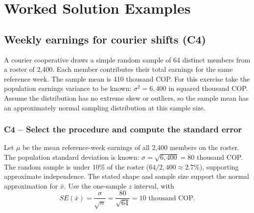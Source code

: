 	\section{Worked Solution Examples}
	\label{sec:worked-solution-examples}


	\subsection{Weekly earnings for courier shifts (C4)}
	\label{prob:c4-1}

	A courier cooperative draws a simple random sample of 64 distinct members from a roster of 2,400. Each member contributes their total earnings for the same reference week. The sample mean is 410 thousand COP. For this exercise take the population earnings variance to be known: $\sigma^2=6{,}400$ in squared thousand COP. Assume the distribution has no extreme skew or outliers, so the sample mean has an approximately normal sampling distribution at this sample size.


	\clearpage

	\label{sol:c4-1-a}
	\subsubsection*{C4 -- Select the procedure and compute the standard error}

	Let $\mu$ be the mean reference-week earnings of all 2,400 members on the roster. The population standard deviation is known: $\sigma=\sqrt{6{,}400}=80$ thousand COP. The random sample is under 10\% of the roster ($64/2{,}400\approx 2.7\%$), supporting approximate independence. The stated shape and sample size support the normal approximation for $\bar x$. Use the one-sample $z$ interval, with
	\[
	SE(\bar x)=\frac{\sigma}{\sqrt n}=\frac{80}{\sqrt{64}}=10\text{ thousand COP}.
	\]

